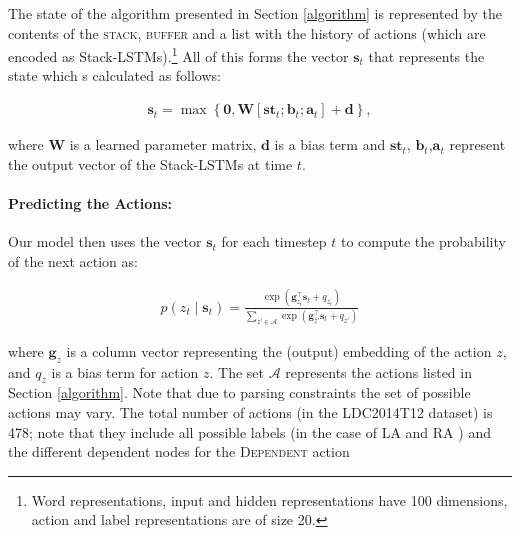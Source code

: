 \documentclass[11pt,a4paper]{article}
\begin{document}
The state of the algorithm presented in Section \ref{algorithm} is represented by the contents of the 
\textsc{stack}, \textsc{buffer}  and a list with the history of actions (which are encoded as Stack-LSTMs).\footnote{
Word representations, input and hidden representations have 100 dimensions, action and label representations 
are of size 20.}
All of this forms the vector  $\mathbf{s}_t$ that represents the state which s calculated as follows:

\vspace{-0.25cm}

\begin{align*}
\mathbf{s}_t = \max \left\{\mathbf{0}, \mathbf{W}[\mathbf{st}_t; \mathbf{b}_t; \mathbf{a}_t] + \mathbf{d}\right\},
\end{align*}

\noindent where $\mathbf{W}$ is a learned parameter matrix, $\mathbf{d}$ is a bias term and $\mathbf{st}_t$,
$\mathbf{b}_t$,$\mathbf{a}_t$ represent the output vector of the Stack-LSTMs at 
time $t$.

\paragraph{Predicting the Actions:}
Our model then uses the vector $\mathbf{s}_t$ for each timestep $t$ to compute the 
probability of the next action as:

\vspace{-0.15cm}
\begin{align}
p(z_t \mid \mathbf{s}_t) = \frac{\exp \left( \mathbf{g}_{z_t}^{\top}
\mathbf{s}_t + q_{z_t} \right)}{\sum_{z' \in \mathcal{A}} \exp \left(
\mathbf{g}_{z'}^{\top} \mathbf{s}_t + q_{z'} \right)}
\label{eq:local-objective}
\end{align}




\noindent where $\mathbf{g}_z$ is a column vector representing the (output) embedding of the action $z$, 
and $q_z$ is a bias term for action $z$. The set $\mathcal{A}$ represents the actions 
listed in Section \ref{algorithm}. Note that due to parsing constraints the set of possible actions 
may vary. The total number of actions (in the LDC2014T12 dataset) is 478; note 
that they include all possible labels (in the case of \textsc{LA} and \textsc{RA} ) and the different dependent 
nodes for the \textsc{Dependent} action
\end{document}
